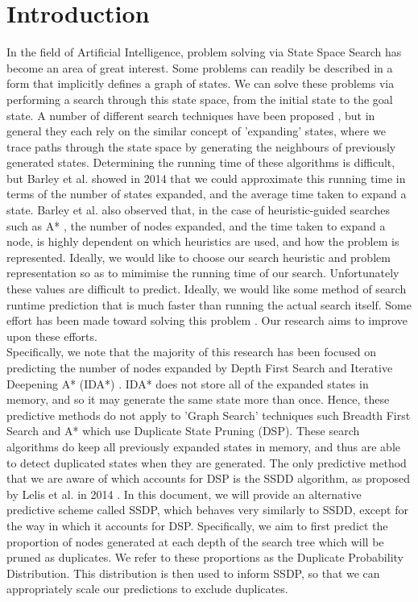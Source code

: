 \documentclass{article}
\begin{document}
\section{Introduction}
In the field of Artificial Intelligence,
problem solving via State Space Search has become an area of great interest.
Some problems can readily be described in a form that implicitly defines a
graph of states. We can solve these problems via performing a search
through this state space, from the initial state to the goal state.
A number of different search techniques have been proposed \cite{dijkstra1959note, hart1968formal, korf1985depth},
but in general they each rely on the similar concept of 'expanding' states,
where we trace paths through the state space by generating the neighbours of previously generated states.
Determining the running time of these algorithms is difficult, but Barley et al. showed in 2014 \cite{barley2014overcoming}
that we could approximate this running time in terms of the number of states expanded, and the average time taken to
expand a state.
Barley et al. also observed that,
in the case of heuristic-guided searches such as A* \cite{hart1968formal},
the number of nodes expanded, and the time taken to expand a node, is highly dependent on
which heuristics are used, and how the problem is represented.
Ideally, we would like to choose our search heuristic and problem representation
so as to mimimise the running time of our search.
Unfortunately these values are difficult to predict.
Ideally, we would like some method of search runtime prediction that is much faster than running the actual search itself.
Some effort has been made toward solving this problem \cite{knuth1975estimating, purdom1978tree, chen1992heuristic, korf2001time, zahavi2010predicting, lelis2013predicting, lelis2014estimating}.
Our research aims to improve upon these efforts. \\

Specifically, we note that the majority of this research has been focused on predicting
the number of nodes expanded by Depth First Search and Iterative Deepening A* (IDA*) \cite{korf1985depth}.
IDA* does not store all of the expanded states in memory, and so it may generate the same state more than once.
Hence, these predictive methods do not apply to 'Graph Search' techniques such Breadth First Search and A*
which use Duplicate State Pruning (DSP). These search algorithms do keep all previously expanded states in memory,
and thus are able to detect duplicated states when they are generated.
The only predictive method that we are aware of which accounts for DSP is the SSDD algorithm,
as proposed by Lelis et al. in 2014 \cite{lelis2014estimating}.
In this document, we will provide an alternative predictive scheme called SSDP,
which behaves very similarly to SSDD, except for the way in which it accounts for DSP.
Specifically, we aim to first predict the proportion of nodes generated
at each depth of the search tree which will be pruned as duplicates. We refer
to these proportions as the Duplicate Probability Distribution.
This distribution is then used to inform SSDP, so that we can appropriately scale our predictions
to exclude duplicates. \\
\end{document}
